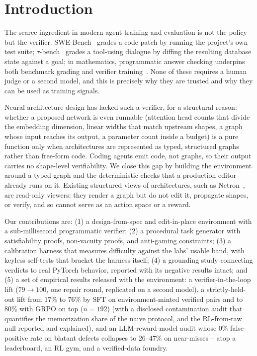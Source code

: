 \documentclass{article}
\begin{document}
\section{Introduction}
The scarce ingredient in modern agent training and evaluation is not the policy but the verifier. SWE-Bench~\cite{swebench} grades a code patch by running the project's own test suite; $\tau$-bench~\cite{taubench} grades a tool-using dialogue by diffing the resulting database state against a goal; in mathematics, programmatic answer checking underpins both benchmark grading and verifier training~\cite{gsm8k}. None of these requires a human judge or a second model, and this is precisely why they are trusted and why they can be used as training signals.

Neural architecture design has lacked such a verifier, for a structural reason: whether a proposed network is even runnable (attention head counts that divide the embedding dimension, linear widths that match upstream shapes, a graph whose input reaches its output, a parameter count inside a budget) is a pure function only when architectures are represented as typed, structured graphs rather than free-form code. Coding agents emit code, not graphs, so their output carries no shape-level verifiability. We close this gap by building the environment around a typed graph and the deterministic checks that a production editor already runs on it. Existing structured views of architectures, such as Netron~\cite{netron}, are read-only viewers: they render a graph but do not edit it, propagate shapes, or verify, and so cannot serve as an action space or a reward.

Our contributions are: (1) a design-from-spec and edit-in-place environment with a sub-millisecond programmatic verifier; (2) a procedural task generator with satisfiability proofs, non-vacuity proofs, and anti-gaming constraints; (3) a calibration harness that measures difficulty against the labs' usable band, with keyless self-tests that bracket the harness itself; (4) a grounding study connecting verdicts to real PyTorch behavior, reported with its negative results intact; and (5) a set of empirical results released with the environment: a verifier-in-the-loop lift ($79\to100$, one repair round, replicated on a second model), a strictly-held-out lift from $17\%$ to $76\%$ by SFT on environment-minted verified pairs and to $80\%$ with GRPO on top ($n{=}192$) (with a disclosed contamination audit that quantifies the memorization share of the naive protocol, and the RL-from-raw null reported and explained), and an LLM-reward-model audit whose $0\%$ false-positive rate on blatant defects collapses to $26$--$47\%$ on near-misses -- atop a leaderboard, an RL gym, and a verified-data foundry.
\end{document}
